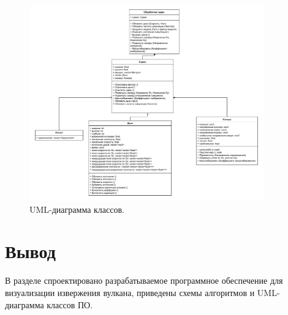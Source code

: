 \begin{figure}[H]
	\centering
	\includegraphics[width=0.9\textwidth,page=1]{assets/img/smoke_uml.pdf}
	\caption{UML-диаграмма классов.}
	\label{fig:uml}
\end{figure}

\section*{Вывод}
В разделе спроектировано разрабатываемое программное обеспечение для визуализации извержения вулкана, приведены схемы алгоритмов и UML-диаграмма классов ПО.
